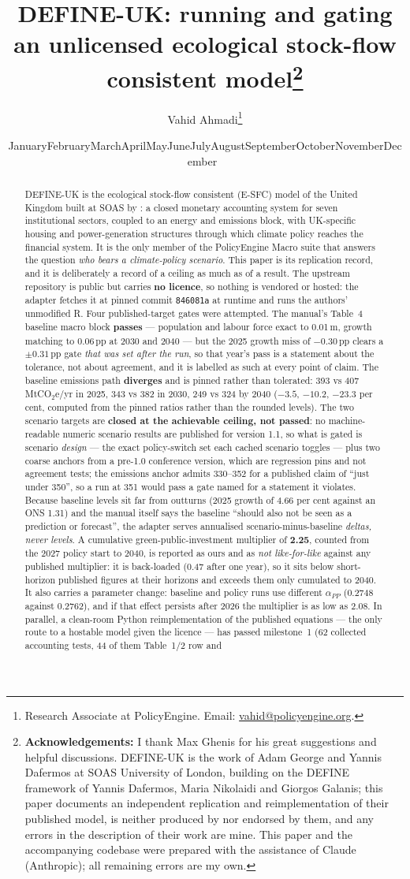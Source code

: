\documentclass[11pt]{article}
\title{\bfseries DEFINE-UK: running and gating an unlicensed ecological stock-flow consistent model\thanks{\textbf{Acknowledgements:} I thank Max Ghenis for his great suggestions and helpful discussions. DEFINE-UK is the work of Adam George and Yannis Dafermos at SOAS University of London, building on the DEFINE framework of Yannis Dafermos, Maria Nikolaidi and Giorgos Galanis; this paper documents an independent replication and reimplementation of their published model, is neither produced by nor endorsed by them, and any errors in the description of their work are mine. This paper and the accompanying codebase were prepared with the assistance of Claude (Anthropic); all remaining errors are my own.}\\[0.7cm]}
\author{Vahid Ahmadi\thanks{Research Associate at PolicyEngine. Email: \href{mailto:vahid@policyengine.org}{vahid@policyengine.org}.}}
\date{\small \ifcase\month\or January\or February\or March\or April\or May\or June\or July\or August\or September\or October\or November\or December\fi\ \the\year}
\begin{document}
\maketitle

\begin{abstract}
\noindent DEFINE-UK is the ecological stock-flow consistent (E-SFC) model of the United Kingdom built at SOAS by \citet{georgedafermos2026manual}: a closed monetary accounting system for seven institutional sectors, coupled to an energy and emissions block, with UK-specific housing and power-generation structures through which climate policy reaches the financial system. It is the only member of the PolicyEngine Macro suite that answers the question \emph{who bears a climate-policy scenario}. This paper is its replication record, and it is deliberately a record of a ceiling as much as of a result. The upstream repository is public but carries \textbf{no licence}, so nothing is vendored or hosted: the adapter fetches it at pinned commit \texttt{846081a} at runtime and runs the authors' unmodified R. Four published-target gates were attempted. The manual's Table~4 baseline macro block \textbf{passes} --- population and labour force exact to 0.01\,m, growth matching to 0.06\,pp at 2030 and 2040 --- but the 2025 growth miss of $-0.30$\,pp clears a $\pm0.31$\,pp gate \emph{that was set after the run}, so that year's pass is a statement about the tolerance, not about agreement, and it is labelled as such at every point of claim. The baseline emissions path \textbf{diverges} and is pinned rather than tolerated: 393 vs 407 MtCO$_2$e/yr in 2025, 343 vs 382 in 2030, 249 vs 324 by 2040 ($-3.5$, $-10.2$, $-23.3$ per cent, computed from the pinned ratios rather than the rounded levels). The two scenario targets are \textbf{closed at the achievable ceiling, not passed}: no machine-readable numeric scenario results are published for version 1.1, so what is gated is scenario \emph{design} --- the exact policy-switch set each cached scenario toggles --- plus two coarse anchors from a pre-1.0 conference version, which are regression pins and not agreement tests; the emissions anchor admits 330--352 for a published claim of ``just under 350'', so a run at 351 would pass a gate named for a statement it violates. Because baseline levels sit far from outturns (2025 growth of 4.66 per cent against an ONS 1.31) and the manual itself says the baseline ``should also not be seen as a prediction or forecast'', the adapter serves annualised scenario-minus-baseline \emph{deltas, never levels}. A cumulative green-public-investment multiplier of \textbf{2.25}, counted from the 2027 policy start to 2040, is reported as ours and as \emph{not like-for-like} against any published multiplier: it is back-loaded (0.47 after one year), so it sits below short-horizon published figures at their horizons and exceeds them only cumulated to 2040. It also carries a parameter change: baseline and policy runs use different $\alpha_{PP}$ (0.2748 against 0.2762), and if that effect persists after 2026 the multiplier is as low as 2.08. In parallel, a clean-room Python reimplementation of the published equations --- the only route to a hostable model given the licence --- has passed milestone~1 (62 collected accounting tests, 44 of them Table~1/2 row and 
\end{abstract}
\end{document}
